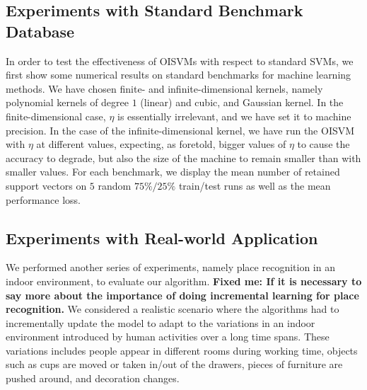\subsection*{Experiments with Standard Benchmark Database}

In order to test the effectiveness of OISVMs with respect to standard
SVMs, we first show some numerical results on standard benchmarks for machine 
learning methods. We have chosen finite- and infinite-dimensional kernels, namely
polynomial kernels of degree $1$ (linear) and cubic, and
Gaussian kernel. In the finite-dimensional case, $\eta$ is
essentially irrelevant, and we have set it to machine precision. 
In the case of the infinite-dimensional kernel, we have run the OISVM with
$\eta$ at different values, expecting, as foretold, bigger values of
$\eta$ to cause the accuracy to degrade, but also the size of the
machine to remain smaller than with smaller values.
For each benchmark, we display the mean number of retained support vectors
on $5$ random $75\%/25\%$ train/test runs as well as the mean performance loss.

\subsection*{Experiments with Real-world Application}

We performed another series of experiments, namely place recognition in an indoor
environment, to evaluate our algorithm. 
\textbf{Fixed me: If it is necessary to say more about the importance of doing incremental
learning for place recognition.}
We considered a realistic scenario where the algorithms had to incrementally update the
model to adapt to the variations in an indoor environment introduced by human activities
over a long time spans. These variations includes people appear in different rooms during
working time, objects such as cups are moved or taken in/out of the drawers, pieces of
furniture are pushed around, and decoration changes.   


